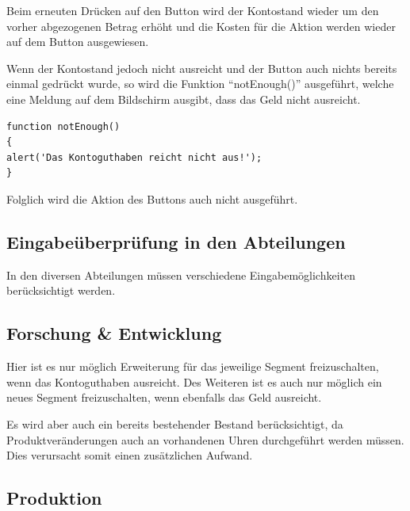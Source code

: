 Beim erneuten Drücken auf den Button wird der Kontostand wieder um den vorher abgezogenen Betrag erhöht und die Kosten für die Aktion werden wieder auf dem Button ausgewiesen. 


Wenn der Kontostand jedoch nicht ausreicht und der Button auch nichts bereits einmal gedrückt wurde, so wird die Funktion \enquote{notEnough()} ausgeführt, welche eine Meldung auf dem Bildschirm ausgibt, dass das Geld nicht ausreicht. 

\lstset{language=Java}
\begin{lstlisting}
function notEnough()
{
alert('Das Kontoguthaben reicht nicht aus!');
}
\end{lstlisting}

Folglich wird die Aktion des Buttons auch nicht ausgeführt.


\subsection*{Eingabeüberprüfung in den Abteilungen}

In den diversen Abteilungen müssen verschiedene Eingabemöglichkeiten berücksichtigt werden. 

\subsection*{Forschung \& Entwicklung}

Hier ist es nur möglich Erweiterung für das jeweilige Segment freizuschalten, wenn das Kontoguthaben ausreicht. Des Weiteren ist es auch nur möglich ein neues Segment freizuschalten, wenn ebenfalls das Geld ausreicht.

Es wird aber auch ein bereits bestehender Bestand berücksichtigt, da Produktveränderungen auch an vorhandenen Uhren durchgeführt werden müssen. Dies verursacht somit einen zusätzlichen Aufwand. 

\subsection*{Produktion}


